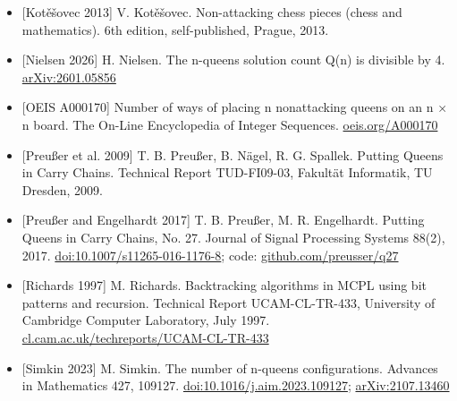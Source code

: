 \begin{itemize}
\item{} [Kotěšovec 2013] V. Kotěšovec. Non-attacking chess pieces (chess and mathematics). 6th edition, self-published, Prague, 2013.
\item{} [Nielsen 2026] H. Nielsen. The n-queens solution count Q(n) is divisible by 4. \href{https://arxiv.org/abs/2601.05856}{arXiv:2601.05856}
\item{} [OEIS A000170] Number of ways of placing n nonattacking queens on an n × n board. The On-Line Encyclopedia of Integer Sequences. \href{https://oeis.org/A000170}{oeis.org/A000170}
\item{} [Preußer et al. 2009] T. B. Preußer, B. Nägel, R. G. Spallek. Putting Queens in Carry Chains. Technical Report TUD-FI09-03, Fakultät Informatik, TU Dresden, 2009.
\item{} [Preußer and Engelhardt 2017] T. B. Preußer, M. R. Engelhardt. Putting Queens in Carry Chains, No. 27. Journal of Signal Processing Systems 88(2), 2017. \href{https://doi.org/10.1007/s11265-016-1176-8}{doi:10.1007/s11265-016-1176-8}; code: \href{https://github.com/preusser/q27}{github.com/preusser/q27}
\item{} [Richards 1997] M. Richards. Backtracking algorithms in MCPL using bit patterns and recursion. Technical Report UCAM-CL-TR-433, University of Cambridge Computer Laboratory, July 1997. \href{https://www.cl.cam.ac.uk/techreports/UCAM-CL-TR-433.html}{cl.cam.ac.uk/techreports/UCAM-CL-TR-433}
\item{} [Simkin 2023] M. Simkin. The number of n-queens configurations. Advances in Mathematics 427, 109127. \href{https://doi.org/10.1016/j.aim.2023.109127}{doi:10.1016/j.aim.2023.109127}; \href{https://arxiv.org/abs/2107.13460}{arXiv:2107.13460}
\end{itemize}

